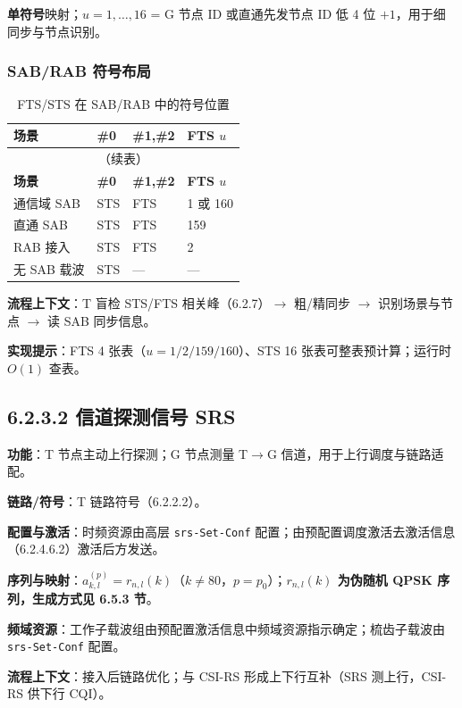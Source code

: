 \documentclass[11pt,a4paper]{ctexart}
\begin{document}
\textbf{单符号}映射；$u=1,\ldots,16$ = G 节点 ID 或直通先发节点 ID 低 4 位 $+1$，用于细同步与节点识别。

\subsubsection{SAB/RAB 符号布局}

\begin{longtable}{llll}
\caption{FTS/STS 在 SAB/RAB 中的符号位置} \\
\toprule
\textbf{场景} & \textbf{\#0} & \textbf{\#1,\#2} & \textbf{FTS $u$} \\
\midrule
\endfirsthead
\multicolumn{4}{c}{\small（续表）} \\
\toprule
\textbf{场景} & \textbf{\#0} & \textbf{\#1,\#2} & \textbf{FTS $u$} \\
\midrule
\endhead
\bottomrule
\endfoot
通信域 SAB & STS & FTS & 1 或 160 \\
直通 SAB & STS & FTS & 159 \\
RAB 接入 & STS & FTS & 2 \\
无 SAB 载波 & STS & --- & --- \\
\end{longtable}

\textbf{流程上下文}：T 盲检 STS/FTS 相关峰（6.2.7）$\rightarrow$ 粗/精同步 $\rightarrow$ 识别场景与节点 $\rightarrow$ 读 SAB 同步信息。

\textbf{实现提示}：FTS 4 张表（$u{=}1/2/159/160$）、STS 16 张表可整表预计算；运行时 $O(1)$ 查表。

\subsection{6.2.3.2 信道探测信号 SRS}

\textbf{功能}：T 节点主动上行探测；G 节点测量 T$\rightarrow$G 信道，用于上行调度与链路适配。

\textbf{链路/符号}：T 链路符号（6.2.2.2）。

\textbf{配置与激活}：时频资源由高层 \texttt{srs-Set-Conf} 配置；由预配置调度激活去激活信息（6.2.4.6.2）激活后方发送。

\textbf{序列与映射}：$a_{k,l}^{(p)}=r_{n,l}(k)$（$k{\neq}80$，$p{=}p_0$）；\textbf{$r_{n,l}(k)$ 为伪随机 QPSK 序列，生成方式见 6.5.3 节}。

\textbf{频域资源}：工作子载波组由预配置激活信息中频域资源指示确定；梳齿子载波由 \texttt{srs-Set-Conf} 配置。

\textbf{流程上下文}：接入后链路优化；与 CSI-RS 形成上下行互补（SRS 测上行，CSI-RS 供下行 CQI）。
\end{document}
